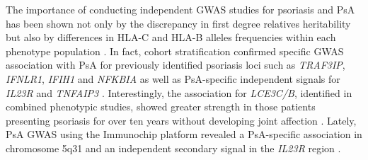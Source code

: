 The importance of conducting independent GWAS studies for psoriasis and PsA has been shown not only by the discrepancy in first degree relatives heritability but also by differences in HLA-C and HLA-B alleles frequencies within each phenotype population \parencite{Winchester2012, Okada2014}. In fact, cohort stratification confirmed specific GWAS association with PsA for previously identified psoriasis loci such as \textit{TRAF3IP}, \textit{IFNLR1}, \textit{IFIH1} and \textit{NFKBIA} as well as PsA-specific independent signals for \textit{IL23R} and \textit{TNFAIP3} \parencite{Ellinghaus2010, Stuart2015}.  Interestingly, the association for \textit{LCE3C/B}, identified in combined phenotypic studies, showed greater strength in those patients presenting psoriasis for over ten years without developing joint affection \parencite{Stuart2015}. Lately, PsA GWAS using the Immunochip platform revealed a PsA-specific association in chromosome 5q31 and an independent secondary signal in the \textit{IL23R} region \parencite{Bowes2015}. 




